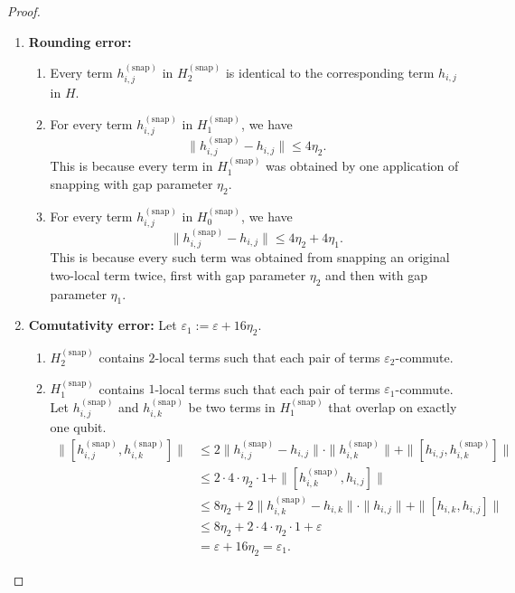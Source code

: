 \documentclass[11pt]{article}
\theoremstyle{plain}
\newcommand{\eps}{\varepsilon}
\newcommand{\snp}{{(\mathrm{snap})}}
\begin{document}
\begin{proof}
\begin{enumerate}
\begin{enumerate}
\begin{enumerate}
        \item Every term $h_{i,j}^\snp$ in $H^\snp_1$ is $\eta_1$-gapped (according to ) on the subsystem acted upon nontrivially.
        \item Every term $h_{i,j}^\snp$ in $H^\snp_0$ is proportional to the identity (zero spectral gap).
    \end{enumerate}
    \item \textbf{Rounding error:}
    \begin{enumerate}
        \item Every term $h^\snp_{i,j}$ in $H^\snp_2$ is identical to the corresponding term $h_{i,j}$ in $H$.
        \item For every term $h^\snp_{i,j}$ in $H^\snp_1$, we have
        \[ \| h^\snp_{i,j} - h_{i,j} \| \leq 4\eta_2. \]
        This is because every term in $H^\snp_1$ was obtained by one application of snapping with gap parameter $\eta_2$.
        \item For every term $h^\snp_{i,j}$ in $H^\snp_0$, we have
        \[ \|h^\snp_{i,j} - h_{i,j}\| \leq 4\eta_2 + 4\eta_1. \]
        This is because every such term was obtained from snapping an original two-local term twice, first with gap parameter $\eta_2$ and then with gap parameter $\eta_1$.
    \end{enumerate}
        \item \textbf{Comutativity error:} Let $\eps_1 := \eps + 16\eta_2$.
    \begin{enumerate}
        \item $H^\snp_2$ contains $2$-local terms such that each pair of terms $\eps_2$-commute.
        \item $H^\snp_1$ contains $1$-local terms such that each pair of terms $\eps_1$-commute. Let $h^\snp_{i, j}$ and $h^\snp_{i, k}$ be two terms in $H^\snp_1$ that overlap on exactly one qubit.
\begin{align}
    \|[h^\snp_{i, j}, h^\snp_{i, k}]\| & \leq 2 \|h^\snp_{i, j} - h_{i, j}\| \cdot \|h^\snp_{i, k}\| + \|[h_{i, j}, h^\snp_{i, k}]\|\\
    & \leq 2 \cdot 4 \cdot  \eta_2 \cdot 1 + \|[h^\snp_{i, k}, h_{i, j}]\|\\
    & \leq 8 \eta_2  +  2 \|h^\snp_{i, k} - h_{i, k}\| \cdot \|h_{i, j}\| + \|[h_{i, k}, h_{i,j}]\|\\
    & \leq 8 \eta_2 + 2 \cdot 4 \cdot \eta_2 \cdot 1 + \eps\\
    & = \eps + 16 \eta_2 = \eps_1.
\end{align}

\end{enumerate}
\end{enumerate}
\end{enumerate}
\end{proof}
\end{document}
